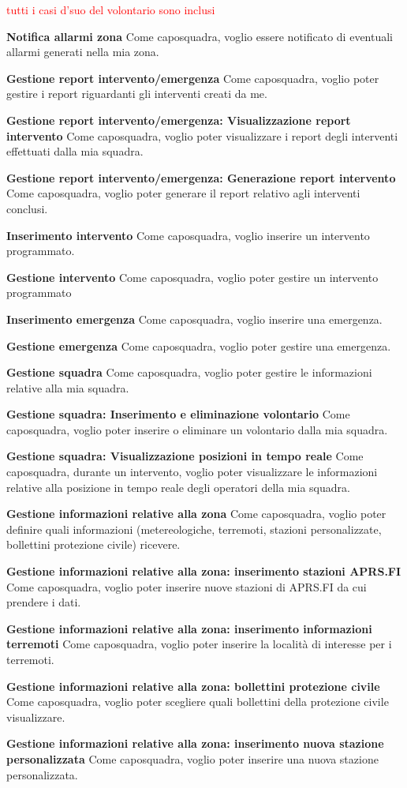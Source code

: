 \textcolor{red}{tutti i casi d'suo del volontario sono inclusi}

\textbf{Notifica allarmi zona}
Come caposquadra, voglio essere notificato di eventuali allarmi generati nella mia zona.

\textbf{Gestione report intervento/emergenza}
Come caposquadra, voglio poter gestire i report riguardanti gli interventi creati da me.

\textbf{Gestione report intervento/emergenza: Visualizzazione report intervento}
Come caposquadra, voglio poter visualizzare i report degli interventi effettuati dalla mia squadra.

\textbf{Gestione report intervento/emergenza: Generazione report intervento}
Come caposquadra, voglio poter generare il report relativo agli interventi conclusi.

\textbf{Inserimento intervento}
Come caposquadra, voglio inserire un intervento programmato.

\textbf{Gestione intervento}
Come caposquadra, voglio poter gestire un intervento programmato

\textbf{Inserimento emergenza}
Come caposquadra, voglio inserire una emergenza.

\textbf{Gestione emergenza}
Come caposquadra, voglio poter gestire una emergenza.

\textbf{Gestione squadra}
Come caposquadra, voglio poter gestire le informazioni relative alla mia squadra.

\textbf{Gestione squadra: Inserimento e eliminazione volontario}
Come caposquadra, voglio poter inserire o eliminare un volontario dalla mia squadra.

\textbf{Gestione squadra: Visualizzazione posizioni in tempo reale}
Come caposquadra, durante un intervento, voglio poter visualizzare le informazioni relative alla posizione in tempo reale degli operatori della mia squadra.

\textbf{Gestione informazioni relative alla zona} 
Come caposquadra, voglio poter definire quali informazioni (metereologiche, terremoti, stazioni personalizzate, bollettini protezione civile) ricevere.

\textbf{Gestione informazioni relative alla zona: inserimento stazioni APRS.FI}
Come caposquadra, voglio poter inserire nuove stazioni di APRS.FI da cui prendere i dati.

\textbf{Gestione informazioni relative alla zona: inserimento informazioni terremoti}
Come caposquadra, voglio poter inserire la località di interesse per i terremoti. 

\textbf{Gestione informazioni relative alla zona: bollettini protezione civile}
Come caposquadra, voglio poter scegliere quali bollettini della protezione civile visualizzare.

\textbf{Gestione informazioni relative alla zona: inserimento nuova stazione personalizzata}
Come caposquadra, voglio poter inserire una nuova stazione personalizzata.